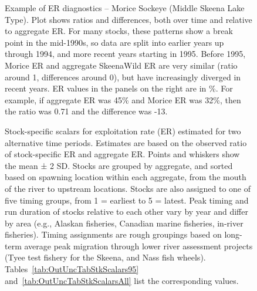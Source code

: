\documentclass[french,11pt]{book}
\begin{document}
\begin{figure}[htb]

{\centering {} 

}

\caption{Example of ER diagnostics -- Morice Sockeye (Middle Skeena Lake Type). Plot shows ratios and differences, both over time and relative to aggregate ER. For many stocks, these patterns show a break point in the mid-1990s, so data are split into earlier years up through 1994, and more recent years starting in 1995. Before 1995, Morice ER and aggregate SkeenaWild ER are very similar (ratio around 1, differences around 0), but have increasingly diverged in recent years. ER values in the panels on the right are in \%. For example, if aggregate ER was 45\% and Morice ER was 32\%, then the ratio was 0.71 and the difference was -13.}\label{fig:StkERDiffMorice}
\end{figure}
\clearpage


\begin{figure}[htb]

{\centering {} 

}

\caption{Stock-specific scalars for exploitation rate (ER) estimated for two alternative time periods. Estimates are based on the observed ratio of stock-specific ER and aggregate ER. Points and whiskers show the mean ± 2 SD. Stocks are grouped by aggregate, and sorted based on spawning location within each aggregate, from the mouth of the river to upstream locations. Stocks are also assigned to one of five timing groups, from 1 = earliest to 5 = latest. Peak timing and run duration of stocks relative to each other vary by year and differ by area (e.g., Alaskan fisheries, Canadian marine fisheries, in-river fisheries). Timing assignments are rough groupings based on long-term average peak migration through lower river assessment projects (Tyee test fishery for the Skeena, and Nass fish wheels). Tables~\ref{tab:OutUncTabStkScalars95} and~\ref{tab:OutUncTabStkScalarsAll} list the corresponding values.}\label{fig:StkERDiffComp}
\end{figure}
\clearpage
\end{document}
